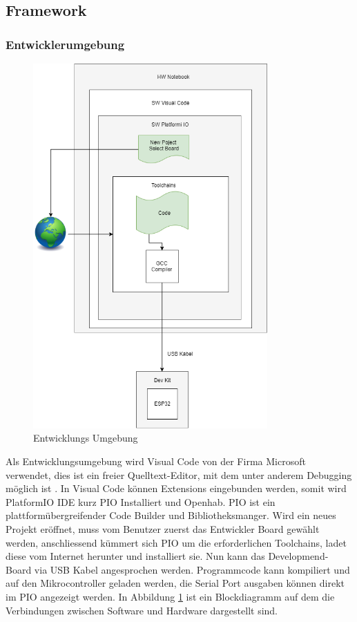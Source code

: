 \newpage
\subsection{Framework}\label{subsec: Framework}

\subsubsection{Entwicklerumgebung} 
\begin{figure}[H]
	\centering
	\includegraphics[width=0.8\textwidth]{graphics/DevelopDiagram.png}
	\caption{Entwicklungs Umgebung}
	\label{pic: PIO}
\end{figure} 

 Als Entwicklungsumgebung wird Visual Code von der Firma Microsoft verwendet, dies ist ein freier Quelltext-Editor, mit dem unter anderem Debugging möglich ist \cite{noauthor_visual_nodate}. In Visual Code können Extensions eingebunden werden, somit wird PlatformIO IDE \cite{platformio_platformio_nodate} kurz PIO Installiert und Openhab.
PIO ist ein plattformübergreifender Code Builder und Bibliotheksmanger. Wird ein neues Projekt eröffnet, muss vom Benutzer zuerst das Entwickler Board gewählt werden, anschliessend kümmert sich PIO um die erforderlichen Toolchains, ladet diese vom Internet herunter und installiert sie. Nun kann das Developmend-Board via USB Kabel angesprochen werden. Programmcode kann kompiliert und auf den Mikrocontroller geladen werden, die Serial Port ausgaben können direkt im PIO angezeigt werden. In Abbildung \ref{pic: PIO} ist ein Blockdiagramm auf dem die Verbindungen zwischen Software und Hardware dargestellt sind.

